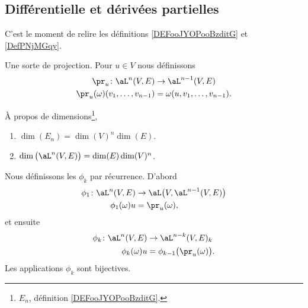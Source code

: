 \subsection{Différentielle et dérivées partielles}

C'est le moment de relire les définitions \ref{DEFooJYOPooBzditG} et \ref{DefPNjMGqy}.

\begin{definition}
    Une sorte de projection. Pour \( u\in V\) nous définissons
    \begin{equation}
        \begin{aligned}
            \pr_u\colon \aL^n(V,E)             & \to \aL^{n-1}(V,E)              \\
            \pr_u(\omega)(v_1,\ldots, v_{n-1}) & =\omega(u,v_1,\ldots, v_{n-1}).
        \end{aligned}
    \end{equation}
\end{definition}

\begin{lemma}      \label{LEMooSMZQooJBVySP}
    À propos de dimensions\footnote{\( E_n\), définition \ref{DEFooJYOPooBzditG}.},
	\begin{enumerate}
		\item       \label{ITEMooUWEBooSzFseN}
		      \( \dim(E_n)=\dim(V)^n\dim(E)\).
		\item       \label{ITEMooFMKQooFSMpgF}
		      \( \dim\big( \aL^n(V,E) \big)=\dim(E)\dim(V)^n\).
	\end{enumerate}
\end{lemma}

\begin{lemma}        \label{LEMooTDLNooTcPkLg}
	Nous définissons les \( \phi_k\) par récurrence. D'abord
	\begin{equation}
		\begin{aligned}
			\phi_1\colon \aL^n(V,E) & \to \aL\big( V,\aL^{n-1}(V,E) \big) \\
			\phi_1(\omega)u         & =\pr_u(\omega),
		\end{aligned}
	\end{equation}
	et ensuite
	\begin{equation}
		\begin{aligned}
			\phi_k\colon \aL^n(V,E) & \to \aL^{n-k}(V,E)_{k}                \\
			\phi_k(\omega)u         & =\phi_{k-1}\big( \pr_u(\omega) \big).
		\end{aligned}
	\end{equation}
	Les applications \( \phi_k\) sont bijectives.
\end{lemma}


